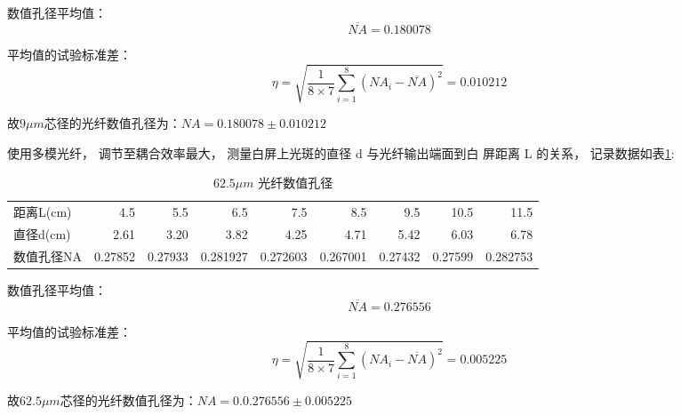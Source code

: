 \documentclass[10pt,a4paper,twoside,UTF8]{ctexart}
\begin{document}
  数值孔径平均值：
  \begin{equation*}
	  \overline{NA}=0.180078 
  \end{equation*}

  平均值的试验标准差：
  \begin{equation*}
	  \eta = \sqrt{\frac{1}{8\times7} \sum_{i = 1}^{8} \left(NA_i-\overline{NA}\right)^2 }=0.010212
  \end{equation*}

  故$9\mu m$芯径的光纤数值孔径为：$NA=0.180078\pm0.010212$


使用多模光纤， 调节至耦合效率最大， 测量白屏上光斑的直径 d 与光纤输出端面到白
屏距离 L 的关系， 记录数据如表\ref{tab:NA62.5}: 
  
\begin{table}[H]
	\caption{$62.5\mu m$ 光纤数值孔径}
	\centering
	  \begin{tabular}{lrrrrrrrr}
		\toprule
	  距离L(cm) & 4.5   & 5.5   & 6.5   & 7.5   & 8.5   & 9.5   & 10.5  & 11.5 \\
	  直径d(cm) & 2.61  & 3.20   & 3.82  & 4.25  & 4.71  & 5.42  & 6.03  & 6.78 \\
	  数值孔径NA & 0.27852 & 0.27933 & 0.281927 & 0.272603 & 0.267001 & 0.27432 & 0.27599 & 0.282753 \\
	    \bottomrule
	  \end{tabular}%
	\label{tab:NA62.5}%
  \end{table}%

  数值孔径平均值：
  \begin{equation*}
	  \overline{NA}=0.276556 
  \end{equation*}

  平均值的试验标准差：
  \begin{equation*}
	  \eta = \sqrt{\frac{1}{8\times7} \sum_{i = 1}^{8} \left(NA_i-\overline{NA}\right)^2 }=0.005225
  \end{equation*}

  故$62.5\mu m$芯径的光纤数值孔径为：$NA=0.0.276556\pm0.005225$
\end{document}
